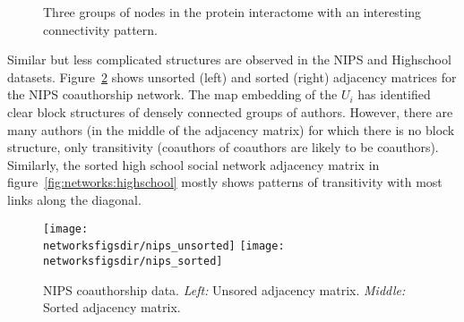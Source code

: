 \begin{figure}[ht]
  \centering
{}
  \caption{Three groups of nodes in the protein interactome with an interesting connectivity pattern.}
  \label{fig:networks:butterfly}
\end{figure}

Similar but less complicated structures are observed in the NIPS and Highschool datasets.
Figure~\ref{fig:networks:nips} shows unsorted (left) and sorted (right) adjacency matrices for the NIPS coauthorship network.
The map embedding of the $U_i$ has identified clear block structures of densely connected groups of authors.
However, there are many authors (in the middle of the adjacency matrix) for which there is no block structure, only transitivity (coauthors of coauthors are likely to be coauthors).
Similarly, the sorted high school social network adjacency matrix in figure~\ref{fig:networks:highschool} mostly shows patterns of transitivity with most links along the diagonal.

\begin{figure}[ht]
  \centering
  \texttt{[image: \\networksfigsdir/nips\_unsorted]}
  \texttt{[image: \\networksfigsdir/nips\_sorted]}
  \caption{NIPS coauthorship data. 
    \emph{Left:} Unsored adjacency matrix. 
    \emph{Middle:} Sorted adjacency matrix.
  }
  \label{fig:networks:nips}
\end{figure}

